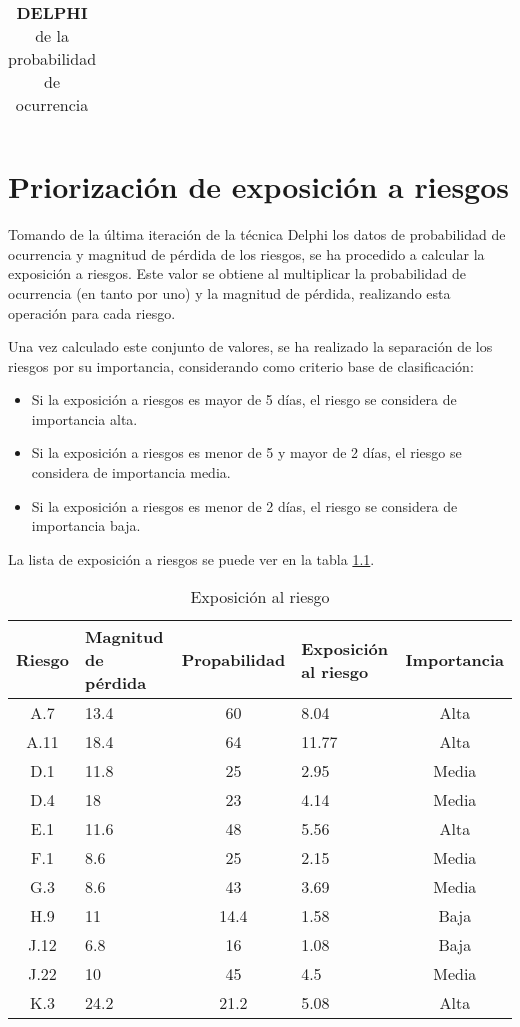 \documentclass[11pt,a4paper,spanish,twoside]{report}
\begin{document}
\begin{table}[!h]
\begin{tabular}{|c|c||c|c|c|c|c||c|c|c||c|}
   \end{tabular}
  \caption{\textbf{DELPHI} de la probabilidad de ocurrencia}
  \label{Tab:DELPHIpro}
\end{table}


\chapter{Priorización de exposición a riesgos}
Tomando de la última iteración de la técnica Delphi los datos de probabilidad
de ocurrencia y magnitud de pérdida de los riesgos, se ha procedido a
calcular la exposición a riesgos. Este valor se obtiene al multiplicar la
probabilidad de ocurrencia (en tanto por uno) y la magnitud de pérdida,
realizando esta operación para cada riesgo.

Una vez calculado este conjunto de valores, se ha realizado la separación de
los riesgos por su importancia, considerando como criterio base de
clasificación:

\begin{itemize}
\item Si la exposición a riesgos es mayor de 5 días, el riesgo se considera de
importancia alta.
\item Si la exposición a riesgos es menor de 5 y mayor de 2 días, el riesgo se
considera de importancia media.
\item Si la exposición a riesgos es menor de 2 días, el riesgo se considera
de importancia baja.
\end{itemize}

La lista de exposición a riesgos se puede ver en la tabla \ref{Tab:Expri}.

\begin{table}[!h]
  \centering
  \begin{tabular}{|c||p{}||c||p{}||c|}
    \hline
    \textbf{Riesgo} & \textbf{Magnitud de pérdida} & \textbf{Propabilidad} & 
    \textbf{Exposición al riesgo} & \textbf{Importancia} \\
    \hline \hline
    A.7 & 13.4 & 60 & 8.04 & Alta \\ 
    \hline
    A.11 & 18.4 & 64 & 11.77 & Alta \\
    \hline 
    D.1 & 11.8 & 25 & 2.95 & Media \\
    \hline
    D.4 & 18 & 23 & 4.14 & Media \\
    \hline
    E.1 & 11.6 & 48 & 5.56 & Alta \\
    \hline
    F.1 & 8.6 & 25 & 2.15 & Media \\
    \hline
    G.3 & 8.6 & 43 & 3.69 & Media \\
    \hline
    H.9 & 11 & 14.4 & 1.58 & Baja \\
    \hline
    J.12 & 6.8 & 16 & 1.08 & Baja \\
    \hline
    J.22 & 10 & 45 & 4.5 & Media \\
    \hline
    K.3 & 24.2 & 21.2 & 5.08 & Alta \\
    \hline
  \end{tabular}
  \caption{Exposición al riesgo} 
  \label{Tab:Expri}
\end{table}
\end{document}
